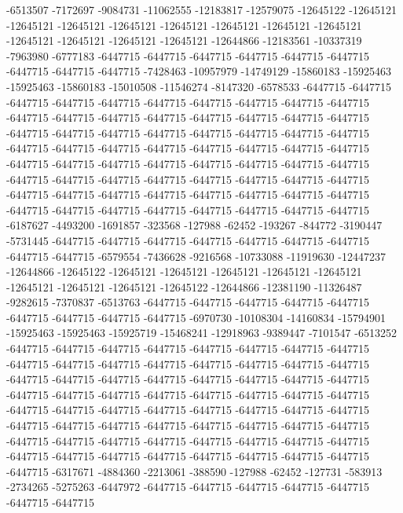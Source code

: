 -6513507 -7172697 -9084731 -11062555 -12183817 -12579075 -12645122 -12645121 -12645121 -12645121 -12645121 -12645121 -12645121 -12645121 -12645121 -12645121 -12645121 -12645121 -12645121 -12644866 -12183561 -10337319 -7963980 -6777183 -6447715 -6447715 -6447715 -6447715 -6447715 -6447715 -6447715 -6447715 -6447715 -7428463 -10957979 -14749129 -15860183 -15925463 -15925463 -15860183 -15010508 -11546274 -8147320 -6578533 -6447715 -6447715 -6447715 -6447715 -6447715 -6447715 -6447715 -6447715 -6447715 -6447715 -6447715 -6447715 -6447715 -6447715 -6447715 -6447715 -6447715 -6447715 -6447715 -6447715 -6447715 -6447715 -6447715 -6447715 -6447715 -6447715 -6447715 -6447715 -6447715 -6447715 -6447715 -6447715 -6447715 -6447715 -6447715 -6447715 -6447715 -6447715 -6447715 -6447715 -6447715 -6447715 -6447715 -6447715 -6447715 -6447715 -6447715 -6447715 -6447715 -6447715 -6447715 -6447715 -6447715 -6447715 -6447715 -6447715 -6447715 -6447715 -6447715 -6447715 -6447715 -6447715 -6447715 -6447715 -6447715 -6447715 -6187627 -4493200 -1691857 -323568 -127988 -62452 -193267 -844772 -3190447 -5731445 -6447715 -6447715 -6447715 -6447715 -6447715 -6447715 -6447715 -6447715
-6447715 -6579554 -7436628 -9216568 -10733088 -11919630 -12447237 -12644866 -12645122 -12645121 -12645121 -12645121 -12645121 -12645121 -12645121 -12645121 -12645121 -12645122 -12644866 -12381190 -11326487 -9282615 -7370837 -6513763 -6447715 -6447715 -6447715 -6447715 -6447715 -6447715 -6447715 -6447715 -6447715 -6970730 -10108304 -14160834 -15794901 -15925463 -15925463 -15925719 -15468241 -12918963 -9389447 -7101547 -6513252 -6447715 -6447715 -6447715 -6447715 -6447715 -6447715 -6447715 -6447715 -6447715 -6447715 -6447715 -6447715 -6447715 -6447715 -6447715 -6447715 -6447715 -6447715 -6447715 -6447715 -6447715 -6447715 -6447715 -6447715 -6447715 -6447715 -6447715 -6447715 -6447715 -6447715 -6447715 -6447715 -6447715 -6447715 -6447715 -6447715 -6447715 -6447715 -6447715 -6447715 -6447715 -6447715 -6447715 -6447715 -6447715 -6447715 -6447715 -6447715 -6447715 -6447715 -6447715 -6447715 -6447715 -6447715 -6447715 -6447715 -6447715 -6447715 -6447715 -6447715 -6447715 -6447715 -6447715 -6447715 -6447715 -6317671 -4884360 -2213061 -388590 -127988 -62452 -127731 -583913 -2734265 -5275263 -6447972 -6447715 -6447715 -6447715 -6447715 -6447715 -6447715 -6447715
